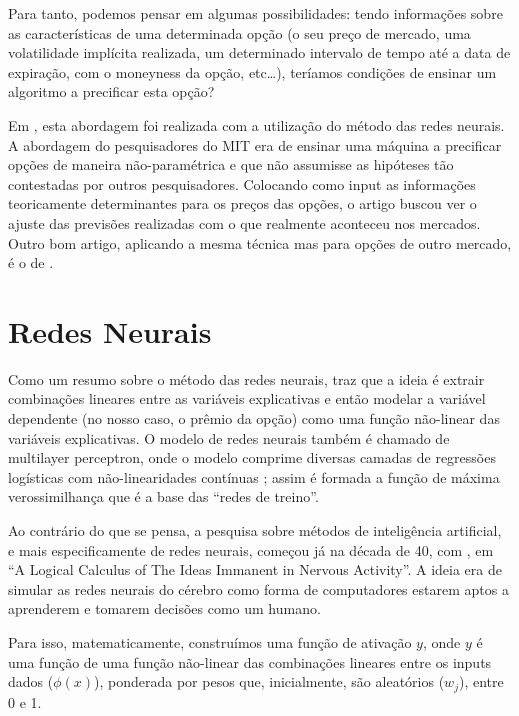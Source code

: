 \documentclass[]{book}
\theoremstyle{definition}
\theoremstyle{definition}
\theoremstyle{definition}
\theoremstyle{remark}
\begin{document}
Para tanto, podemos pensar em algumas possibilidades: tendo informações sobre as características de uma determinada opção (o seu preço de mercado, uma volatilidade implícita realizada, um determinado intervalo de tempo até a data de expiração, com o moneyness da opção, etc\ldots{}), teríamos condições de ensinar um algoritmo a precificar esta opção?

Em \citep{Hutchinson1994}, esta abordagem foi realizada com a utilização do método das redes neurais. A abordagem do pesquisadores do MIT era de ensinar uma máquina a precificar opções de maneira não-paramétrica e que não assumisse as hipóteses tão contestadas por outros pesquisadores. Colocando como input as informações teoricamente determinantes para os preços das opções, o artigo buscou ver o ajuste das previsões realizadas com o que realmente aconteceu nos mercados. Outro bom artigo, aplicando a mesma técnica mas para opções de outro mercado, é o de \citep{Huynh2018}.

\hypertarget{redes-neurais-1}{%
\section{Redes Neurais}\label{redes-neurais-1}}

Como um resumo sobre o método das redes neurais, \citep[389]{Friedman2001} traz que a ideia é extrair combinações lineares entre as variáveis explicativas e então modelar a variável dependente (no nosso caso, o prêmio da opção) como uma função não-linear das variáveis explicativas.
O modelo de redes neurais também é chamado de multilayer perceptron, onde o modelo comprime diversas camadas de regressões logísticas com não-linearidades contínuas \citep[226]{Bishop2006}; assim é formada a função de máxima verossimilhança que é a base das ``redes de treino''.

Ao contrário do que se pensa, a pesquisa sobre métodos de inteligência artificial, e mais especificamente de redes neurais, começou já na década de 40, com \citep{Mcculloch1943}, em ``A Logical Calculus of The Ideas Immanent in Nervous Activity''. A ideia era de simular as redes neurais do cérebro como forma de computadores estarem aptos a aprenderem e tomarem decisões como um humano.

Para isso, matematicamente, construímos uma função de ativação \(y\), onde \(y\) é uma função de uma função não-linear das combinações lineares entre os inputs dados (\(\phi(x)\)), ponderada por pesos que, inicialmente, são aleatórios (\(w_j\)), entre 0 e 1.
\end{document}
